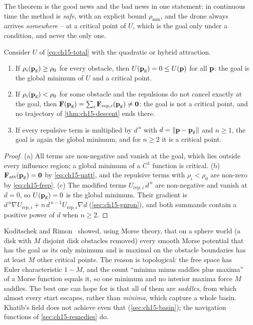 The theorem is the good news and the bad news in one statement: in
continuous time the method is \emph{safe}, with an explicit bound
$\rho_{\min}$, and the drone always arrives \emph{somewhere} -- at a critical
point of $U$, which is the goal only under a condition, and never the only
one.

\begin{proposition}
\label{thm:ch15-goal}
Consider $U$ of \cref{eq:ch15-total} with the quadratic or hybrid attraction.
\begin{enumerate}[label=(\alph*)]
  \item If $\rho_i(\mathbf{p}_{\mathrm{g}}) \ge \rho_0$ for every obstacle, then $U(\mathbf{p}_{\mathrm{g}}) = 0 \le U(\mathbf{p})$ for all $\mathbf{p}$: the goal is the global minimum of $U$ and a critical point.
  \item If $\rho_i(\mathbf{p}_{\mathrm{g}}) < \rho_0$ for some obstacle and the repulsions do not cancel exactly at the goal, then $\mathbf{F}(\mathbf{p}_{\mathrm{g}}) = \sum_i \mathbf{F}_{\mathrm{rep},i}(\mathbf{p}_{\mathrm{g}}) \ne \mathbf{0}$: the goal is not a critical point, and no trajectory of \cref{thm:ch15-descent} ends there.
  \item If every repulsive term is multiplied by $d^{\,n}$ with $d = \left\lVert \mathbf{p} - \mathbf{p}_{\mathrm{g}} \right\rVert$ and $n \ge 1$, the goal is again the global minimum, and for $n \ge 2$ it is a critical point.
\end{enumerate}
\end{proposition}
\begin{proof}
(a) All terms are non-negative and vanish at the goal, which lies outside
every influence region; a global minimum of a $C^1$ function is critical. (b) $\mathbf{F}_{\mathrm{att}}(\mathbf{p}_{\mathrm{g}}) = \mathbf{0}$ by
\cref{eq:ch15-uatt}, and the repulsive terms with $\rho_i < \rho_0$ are
non-zero by \cref{eq:ch15-frep}. (c) The modified terms $U_{\mathrm{rep},i}\,
d^{\,n}$ are non-negative and vanish at $d = 0$, so $U(\mathbf{p}_{\mathrm{g}}) = 0$
is the global minimum. Their gradient is $d^{\,n} \nabla U_{\mathrm{rep},i} +
n\, d^{\,n-1} U_{\mathrm{rep},i} \nabla d$ (\cref{sec:ch15-gnron}), and both
summands contain a positive power of $d$ when $n \ge 2$.
\end{proof}

\begin{remark}
\label{rem:ch15-saddles}
Koditschek and Rimon~\cite{koditschek1990navigation} showed, using Morse
theory, that on a sphere world (a disk with $M$ disjoint disk obstacles
removed) every smooth Morse potential that has the goal as its only minimum and is
maximal on the obstacle boundaries has at least $M$ other critical points.
The reason is topological: the free space has Euler characteristic $1 - M$,
and the count ``minima minus saddles plus maxima'' of a Morse function equals
it, so one minimum and no interior maxima force $M$ saddles. The best one can
hope for is that all of them are \emph{saddles}, from which almost every
start escapes, rather than \emph{minima}, which capture a whole basin.
Khatib's field does not achieve even that (\cref{sec:ch15-basin}); the
navigation functions of \cref{sec:ch15-remedies} do.
\end{remark}

